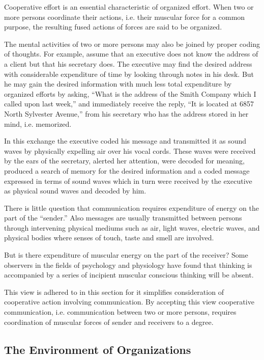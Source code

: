 Cooperative effort is an essential characteristic of organized effort. When two or more persons coordinate their actions, i.e. their muscular force for a common purpose, the resulting fused actions of forces are said to be organized.

The mental activities of two or more persons may also be joined by proper coding of thoughts. For example, assume that an executive does not know the address of a client but that his secretary does. The executive may find the desired address with considerable expenditure of time by looking through notes in his desk. But he may gain the desired information with much less total expenditure by organized efforts by asking, ``What is the address of the Smith Company which I called upon last week,'' and immediately receive the reply, ``It is located at 6857 North Sylvester Avenue,'' from his secretary who has the address stored in her mind, i.e. memorized.

In this exchange the executive coded his message and transmitted it as sound waves by physically expelling air over his vocal cords. These waves were received by the ears of the secretary, alerted her attention, were decoded for meaning, produced a search of memory for the desired information and a coded message expressed in terms of sound waves which in turn were received by the executive as physical sound waves and decoded by him.

There is little question that communication requires expenditure of energy on the part of the ``sender.'' Also messages are usually transmitted between persons through intervening physical mediums such as air, light waves, electric waves, and physical bodies where senses of touch, taste and smell are involved.

But is there expenditure of muscular energy on the part of the receiver?  Some observers in the fields of psychology and physiology have found that thinking is accompanied by a series of incipient muscular conscious thinking will be absent.

This view is adhered to in this section for it simplifies consideration of cooperative action involving communication. By accepting this view cooperative communication, i.e. communication between two or more persons, requires coordination of muscular forces of sender and receivers to a degree.

\subsection{The Environment of Organizations}

